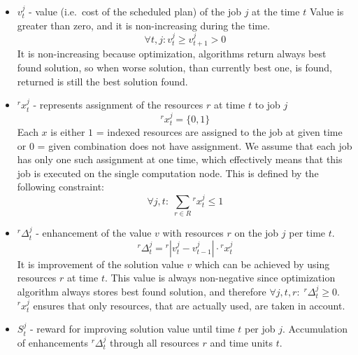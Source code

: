 \begin{itemize}
    \item $v_{t}^{j}$ - value (i.e.\ cost of the scheduled plan) of the job $j$ at the time $t$
          Value is greater than zero, and it is non-increasing during the time. 
          \begin{equation}
              \forall t, j: v_{t}^{j} \geq v_{t+1}^{j} > 0 
          \end{equation}
          It is non-increasing because optimization, algorithms return always best found solution, 
          so when worse solution, than currently best one, is found,
          returned is still the best solution found.
    \item $^{r}x_{t}^{j}$ - represents assignment of the resources $r$ at time $t$ to job $j$
          \begin{equation}
              ^{r}x_{t}^{j} = \{0, 1\} 
          \end{equation}
          Each $x$ is either $1$ = indexed resources are assigned to the job at given time or $0$ = given combination does not have assignment.
          We assume that each job has only one such assignment at one time,
          which effectively means that this job is executed on the single computation node.
          This is defined by the following constraint:
          \begin{equation}
              \forall j, t:\; \sum_{r \in R} {}^{r}x_{t}^{j} \leq 1 
          \end{equation}
    \item $^{r}\Delta_{t}^{j}$ - enhancement of the value $v$ with resources $r$ on the job $j$ per time $t$.
          \begin{equation}
              ^{r}\Delta_{t}^{j} = {}^{r}| v_{t}^{j} - v_{t-1}^{j}| \cdot {}^{r}x_{t}^{j}
          \end{equation}
          It is improvement of the solution value $v$ which can be achieved by using resources $r$ at time $t$.
          This value is always non-negative since optimization algorithm always stores best found solution,
          and therefore $\forall j, t, r:\; {}^{r}\Delta_{t}^{j} \geq 0$. 
          ${}^{r}x_{t}^{j}$ ensures that only resources, 
          that are actually used, are taken in account.
    \item $S_{t}^{j}$ - reward for improving solution value until time $t$ per job $j$.
          Accumulation of enhancements $^{r}\Delta_{t}^{j}$ through all resources $r$ and time units $t$.
          \begin{equation}

\end{equation}
\end{itemize}
